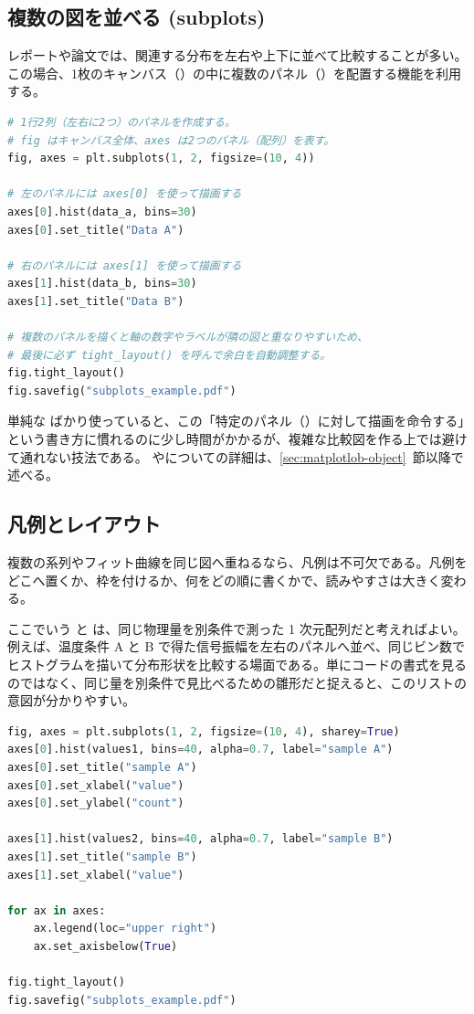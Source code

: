\subsection{複数の図を並べる (subplots)}

レポートや論文では、関連する分布を左右や上下に並べて比較することが多い。この場合、1枚のキャンバス（）の中に複数のパネル（）を配置する機能を利用する。

\begin{lstlisting}[language=Python]
# 1行2列（左右に2つ）のパネルを作成する。
# fig はキャンバス全体、axes は2つのパネル（配列）を表す。
fig, axes = plt.subplots(1, 2, figsize=(10, 4))

# 左のパネルには axes[0] を使って描画する
axes[0].hist(data_a, bins=30)
axes[0].set_title("Data A")

# 右のパネルには axes[1] を使って描画する
axes[1].hist(data_b, bins=30)
axes[1].set_title("Data B")

# 複数のパネルを描くと軸の数字やラベルが隣の図と重なりやすいため、
# 最後に必ず tight_layout() を呼んで余白を自動調整する。
fig.tight_layout()
fig.savefig("subplots_example.pdf")
\end{lstlisting}

単純な  ばかり使っていると、この「特定のパネル（）に対して描画を命令する」という書き方に慣れるのに少し時間がかかるが、複雑な比較図を作る上では避けて通れない技法である。 やについての詳細は、\ref{sec:matplotlob-object}~節以降で述べる。

\subsection{凡例とレイアウト}

複数の系列やフィット曲線を同じ図へ重ねるなら、凡例は不可欠である。凡例をどこへ置くか、枠を付けるか、何をどの順に書くかで、読みやすさは大きく変わる。

ここでいう  と  は、同じ物理量を別条件で測った 1 次元配列だと考えればよい。例えば、温度条件 A と B で得た信号振幅を左右のパネルへ並べ、同じビン数でヒストグラムを描いて分布形状を比較する場面である。単にコードの書式を見るのではなく、同じ量を別条件で見比べるための雛形だと捉えると、このリストの意図が分かりやすい。

\begin{lstlisting}[language=Python]
fig, axes = plt.subplots(1, 2, figsize=(10, 4), sharey=True)
axes[0].hist(values1, bins=40, alpha=0.7, label="sample A")
axes[0].set_title("sample A")
axes[0].set_xlabel("value")
axes[0].set_ylabel("count")

axes[1].hist(values2, bins=40, alpha=0.7, label="sample B")
axes[1].set_title("sample B")
axes[1].set_xlabel("value")

for ax in axes:
    ax.legend(loc="upper right")
    ax.set_axisbelow(True)

fig.tight_layout()
fig.savefig("subplots_example.pdf")
\end{lstlisting}

